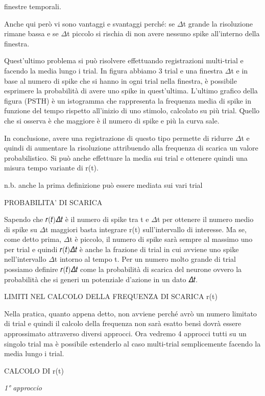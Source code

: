 \documentclass[12pt,a4paper]{book}
\begin{document}
finestre temporali.

Anche qui però vi sono vantaggi e svantaggi perché: se $\Delta$t grande la risoluzione rimane bassa e se $\Delta$t piccolo si rischia di non avere nessuno spike all'interno della finestra.

Quest'ultimo problema si può risolvere effettuando registrazioni multi-trial e facendo la media lungo i trial. In figura abbiamo 3 trial e una finestra $\Delta$t e in base al numero di spike che si hanno in ogni trial nella finestra, è possibile esprimere la probabilità di avere uno spike in quest'ultima. L'ultimo grafico della figura (PSTH) è un istogramma che rappresenta la frequenza media di spike in funzione del tempo rispetto all'inizio di uno stimolo, calcolato su più trial. Quello che si osserva è che maggiore è il numero di spike e più la curva sale.

In conclusione, avere una registrazione di questo tipo permette di ridurre $\Delta$t e quindi di aumentare la risoluzione attribuendo alla frequenza di scarica un valore probabilistico. Si può anche effettuare la media sui trial e ottenere quindi una misura tempo variante di r(t).

n.b. anche la prima definizione può essere mediata sui vari trial

PROBABILITA' DI SCARICA

Sapendo che 𝑟(𝑡)𝛥𝑡 è il numero di spike tra t e $\Delta$t per ottenere il numero medio di spike su $\Delta$t maggiori basta integrare r(t) sull'intervallo di interesse. Ma se, come detto prima, $\Delta$t è piccolo, il numero di spike sarà sempre al massimo uno per trial e quindi 𝑟(𝑡)𝛥𝑡 è anche la frazione di trial in cui avviene uno spike nell'intervallo $\Delta$t intorno al tempo t. Per un numero molto grande di trial possiamo definire 𝑟(𝑡)𝛥𝑡 come la probabilità di scarica del neurone ovvero la probabilità che si generi un potenziale d'azione in un dato 𝛥𝑡.

LIMITI NEL CALCOLO DELLA FREQUENZA DI SCARICA r(t)

Nella pratica, quanto appena detto, non avviene perché avrò un numero limitato di trial e quindi il calcolo della frequenza non sarà esatto bensì dovrà essere approssimato attraverso diversi approcci. Ora vedremo 4 approcci tutti su un singolo trial ma è possibile estenderlo al caso multi-trial semplicemente facendo la media lungo i trial.

CALCOLO DI r(t)

\textit{1°}\textit{ }\textit{approccio}
\end{document}
